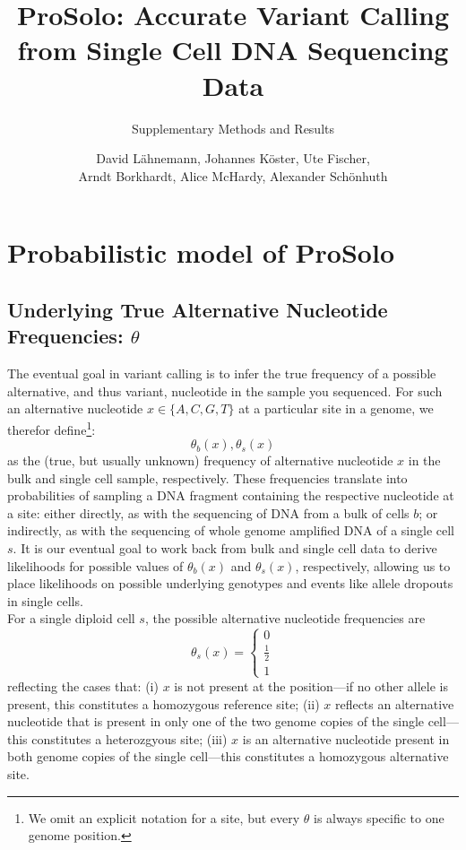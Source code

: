 \documentclass[authoryear,preprint,11pt]{scrartcl}
\begin{document}
\title{ProSolo: Accurate Variant Calling from Single Cell DNA Sequencing Data}
\subtitle{Supplementary Methods and Results}

\author{David Lähnemann, Johannes Köster, Ute Fischer, \\ Arndt Borkhardt, Alice McHardy, Alexander Schönhuth}

\maketitle

\tableofcontents

\section{Probabilistic model of ProSolo}

\subsection{Underlying True Alternative Nucleotide Frequencies: $\theta$}
\label{sec.afs}

The eventual goal in variant calling is to infer the true frequency of a possible alternative, and thus variant, nucleotide in the sample you sequenced.
For such an alternative nucleotide $x\in\{A,C,G,T\}$ at a particular site in a genome, we therefor define\footnote{We omit an explicit notation for a site, but every $\theta$ is always specific to one genome position.}:
\begin{equation}
 \theta_{b}(x), \theta_{s}(x)
\end{equation}
as the (true, but usually unknown) frequency of alternative nucleotide $x$ in the bulk and single cell sample, respectively.
These frequencies translate into probabilities of sampling a DNA fragment containing the respective nucleotide at a site:
either directly, as with the sequencing of DNA from a bulk of cells $b$;
or indirectly, as with the sequencing of whole genome amplified DNA of a single cell $s$.
It is our eventual goal to work back from bulk and single cell data to derive likelihoods for possible values of $\theta_{b}(x)$ and $\theta_{s}(x)$, respectively, allowing us to place likelihoods on possible underlying genotypes and events like allele dropouts in single cells.\\

For a single diploid cell $s$, the possible alternative nucleotide frequencies are
\begin{equation}
 \theta_s(x) =
 \begin{cases}
  0       \\
  \frac12 \\
  1
 \end{cases}
\end{equation}
reflecting the cases that:
(i) $x$ is not present at the position---if no other allele is present, this constitutes a homozygous reference site;
(ii) $x$ reflects an alternative nucleotide that is present in only one of the two genome copies of the single cell---this constitutes a heterozgyous site;
(iii) $x$ is an alternative nucleotide present in both genome copies of the single cell---this constitutes a homozygous alternative site.
\end{document}
